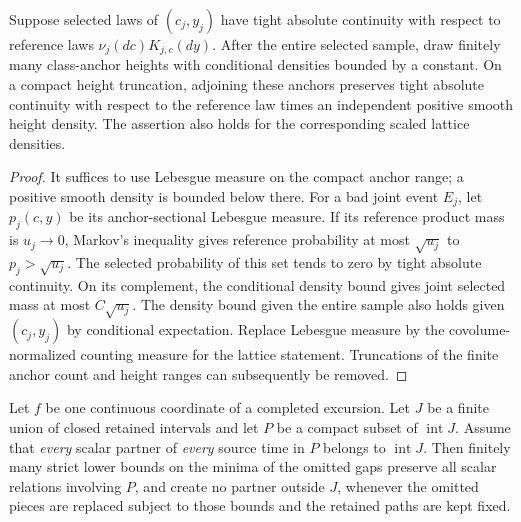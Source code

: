 \begin{lemma}\label{view:anchor-transfer}
Suppose selected laws of $(c_j,y_j)$ have tight absolute continuity with
respect to reference laws $\nu_j(dc)K_{j,c}(dy)$.  After the entire selected
sample, draw finitely many class-anchor heights with conditional densities
bounded by a constant.  On a compact height truncation, adjoining these
anchors preserves tight absolute continuity with respect to the reference
law times an independent positive smooth height density.  The assertion
also holds for the corresponding scaled lattice densities.
\end{lemma}

\begin{proof}
It suffices to use Lebesgue measure on the compact anchor range; a
positive smooth density is bounded below there.  For a bad joint event
$E_j$, let $p_j(c,y)$ be its anchor-sectional Lebesgue measure.  If its
reference product mass is $u_j\to0$, Markov's inequality gives reference
probability at most $\sqrt{u_j}$ to $p_j>\sqrt{u_j}$.  The selected
probability of this set tends to zero by tight absolute continuity.
On its complement, the conditional density bound gives joint selected
mass at most $C\sqrt{u_j}$.  The density bound given the entire sample
also holds given $(c_j,y_j)$ by conditional expectation.  Replace
Lebesgue measure by the covolume-normalized counting measure for the
lattice statement.  Truncations of the finite anchor count and height
ranges can subsequently be removed.
\end{proof}

\begin{lemma}
\label{view:full-fiber-guards}
Let $f$ be one continuous coordinate of a completed excursion.  Let $J$
be a finite union of closed retained intervals and let $P$ be a compact
subset of $\operatorname{int}J$.  Assume that \emph{every} scalar partner
of \emph{every} source time in $P$ belongs to $\operatorname{int}J$.
Then finitely many strict lower bounds on the minima of the omitted
gaps preserve all scalar relations involving $P$, and create no partner
outside $J$, whenever the omitted pieces are replaced subject to those
bounds and the retained paths are kept fixed.
\end{lemma}

